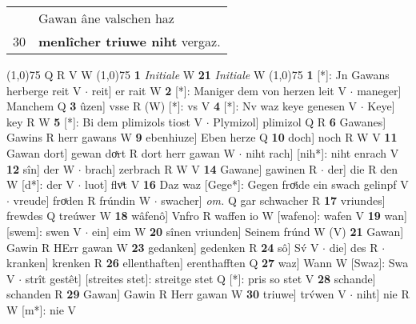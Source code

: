 \documentclass[8pt,a4paper,notitlepage]{article}
\begin{document}
\begin{table}[ht]
\begin{minipage}[t]{0.5\linewidth}
\begin{tabular}{rl}
 & Gawan âne valschen haz\\ 
30 & \textbf{menlîcher triuwe niht} vergaz.\\ 
\end{tabular}
\scriptsize
\line(1,0){75} \newline
Q R V W \newline
\line(1,0){75} \newline
\textbf{1} \textit{Initiale} W  \textbf{21} \textit{Initiale} W  \newline
\line(1,0){75} \newline
\textbf{1} [*]: Jn Gawans herberge reit V  $\cdot$ reit] er rait W \textbf{2} [*]: Maniger dem von herzen leit V  $\cdot$ maneger] Manchem Q \textbf{3} ûzen] vsse R (W) [*]: vs  V \textbf{4} [*]: Nv waz keye genesen V  $\cdot$ Keye] key R W \textbf{5} [*]: Bi dem plimizols tiost V  $\cdot$ Plymizol] plimizol Q R \textbf{6} Gawanes] Gawins R herr gawans W \textbf{9} ebenhiuze] Eben herze Q \textbf{10} doch] noch R W V \textbf{11} Gawan dort] gewan doͯrt R dort herr gawan W  $\cdot$ niht rach] [nih*]: niht enrach V \textbf{12} sîn] der W  $\cdot$ brach] zerbrach R W V \textbf{14} Gawane] gawinen R  $\cdot$ der] die R den W [d*]: der V  $\cdot$ luot] flvͦt V \textbf{16} Daz waz [Gege*]: Gegen froͤide ein swach gelinpf V  $\cdot$ vreude] froͯden R frúndin W  $\cdot$ swacher] \textit{om.} Q gar schwacher R \textbf{17} vriundes] frewdes Q treúwer W \textbf{18} wâfenô] Vnfro R waffen io W [wafeno]: wafen V \textbf{19} wan] [swem]: swen V  $\cdot$ ein] eim W \textbf{20} sînen vriunden] Seinem frúnd W (V) \textbf{21} Gawan] Gawin R HErr gawan W \textbf{23} gedanken] gedenken R \textbf{24} sô] Sv́ V  $\cdot$ die] des R  $\cdot$ kranken] krenken R \textbf{26} ellenthaften] erenthafften Q \textbf{27} waz] Wann W [Swaz]: Swa V  $\cdot$ strît gestêt] [streites stet]: streitge stet Q [*]: pris so stet V \textbf{28} schande] schanden R \textbf{29} Gawan] Gawin R Herr gawan W \textbf{30} triuwe] trv́wen V  $\cdot$ niht] nie R W [m*]: nie V \newline
\end{minipage}
\end{table}
\end{document}
